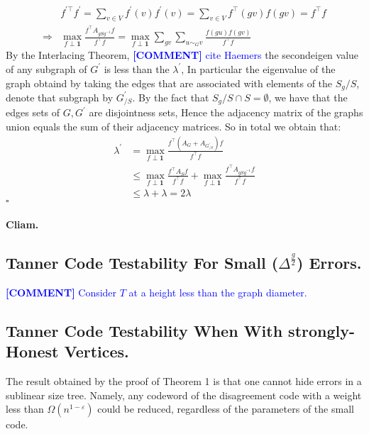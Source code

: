 \documentclass{article}
\newcommand{\commentt}[1]{\textcolor{blue}{ \textbf{[COMMENT]} #1}}
\newcommand{\ctt}[1]{\commentt{#1}}
\begin{document}
\begin{multicols*}{2}
  \begin{equation*}
    \begin{split}
     &  f^{\prime \top}f^{\prime}   = \sum_{v \in V}f^{\prime}\left( v \right)f^{\prime}\left( v \right)   =   \sum_{v \in V } f^{\top}\left( gv \right)f\left( gv \right) = f^{\top}f \\
    \Rightarrow  &  \max_{f \perp \mathbf{1}} { \frac{f^{\top}A_{gSg^{-1}} f  }{ f^{\top}f}} =\max_{f \perp \mathbf{1}} { \sum_{gv}\sum_{ u\sim_{G} v }\frac{f\left( gu \right) f \left( gv \right)  }{ f^{\top}f}} 
    \end{split}
  \end{equation*}
  By the Interlacing Theorem, \ctt{cite Haemers} the secondeigen value of any subgraph of $G^{\prime}$ is less than the $\lambda^{\prime}$, In particular the eigenvalue of the graph obtaind by taking the edges that are associated with elements of the $ S_{g} / S $, denote that subgraph by $G^{\prime}_{ / S}$.  By the fact that $S_{g} / S \cap S = \emptyset $, we have that the edges sets of $G,G^{\prime}$ are disjointness sets, Hence the adjacency matrix of the graphs union equals the sum of their adjacency matrices. So in total we obtain that:  
    \begin{equation*}
    \begin{split}
      \lambda^{\prime} &= \max_{f \perp \mathbf{1}} { \frac{f^{\top} \left( A_{G} + A_{G^{\prime}_{/S}} \right) f  }{ f^{\top}f}} \\
      & \le  \max_{f \perp \mathbf{1}} { \frac{f^{\top}A_{S} f  }{ f^{\top}f}} +  \max_{f \perp \mathbf{1}} { \frac{f^{\top}A_{gSg^{-1}} f  }{ f^{\top}f}} \\
      & \le \lambda + \lambda = 2\lambda
    \end{split}
  \end{equation*} 
  $\square$ 
  \paragraph{Cliam.}  

  \subsection{Tanner Code Testability For Small ($ \Delta^{\frac{g}{2}} $) Errors.} 
  \ctt{Consider $T$ at a height less than the graph diameter.  } 
  \subsection{Tanner Code Testability When With strongly-Honest Vertices. }
  The result obtained by the proof of Theorem 1 is that one cannot hide errors in a sublinear size tree. Namely, any codeword of the disagreement code with a weight less than $ \Omega \left( n^{1-\varepsilon} \right) $ could be reduced, regardless of the parameters of the small code. 

\end{multicols*}
\end{document}
